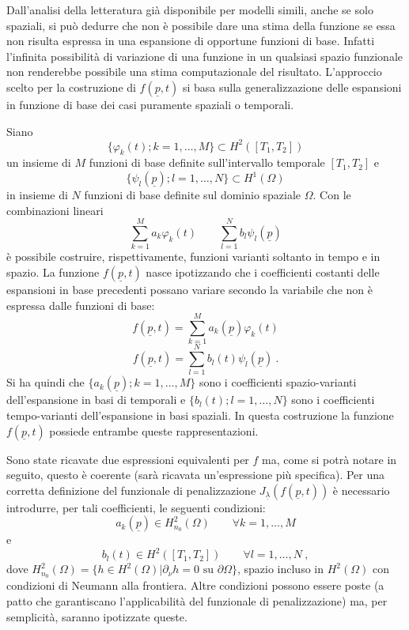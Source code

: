 \documentclass[a4paper,11pt,twoside,openright]{book}							%
\begin{document}
Dall'analisi della letteratura già disponibile per modelli simili, anche se solo spaziali, si può dedurre che non è possibile dare una stima della funzione se essa non risulta espressa in una espansione di opportune funzioni di base. Infatti l'infinita possibilità di variazione di una funzione in un qualsiasi spazio funzionale non renderebbe possibile una stima computazionale del risultato. L'approccio scelto per la costruzione di $f(\underline p,t)$ si basa sulla generalizzazione delle espansioni in funzione di base dei casi puramente spaziali o temporali.

Siano 
$$
\{ \varphi_k(t);k=1, \ldots , M \} \subset H^2([T_1,T_2])
$$
un insieme di $M$ funzioni di base definite sull'intervallo temporale $[T_1,T_2]$ e
$$
\{ \psi_l(\underline p);l=1, \ldots , N \} \subset H^1(\Omega)
$$
in insieme di $N$ funzioni di base definite sul dominio spaziale $\Omega$. Con le combinazioni lineari
$$
\sum_{k=1}^M a_k\varphi_k(t) \qquad \sum_{l=1}^N b_l\psi_l(\underline p)
$$
è possibile costruire, rispettivamente, funzioni varianti soltanto in tempo e in spazio. La funzione $f(\underline p,t)$ nasce ipotizzando che i coefficienti costanti delle espansioni in base precedenti possano variare secondo la variabile che non è espressa dalle funzioni di base:
\begin{equation} 
\label{eq:f_temp}
f(\underline p, t) = \sum_{k=1}^M a_k(\underline p)\varphi_k(t)
\end{equation}
\begin{equation}
\label{eq:f_space}
f(\underline p, t) = \sum_{l=1}^N b_l(t)\psi_l(\underline p) \ .
\end{equation}
Si ha quindi che $\{ a_k(\underline p);k=1, \ldots , M \}$ sono i coefficienti spazio-varianti dell'espansione in basi di temporali e $\{ b_l(t);l=1, \ldots , N \}$ sono i coefficienti tempo-varianti dell'espansione in basi spaziali. In questa costruzione la funzione $f(\underline p,t)$ possiede entrambe queste rappresentazioni.

Sono state ricavate due espressioni equivalenti per $f$ ma, come si potrà notare in seguito, questo è coerente (sarà ricavata un'espressione più specifica). Per una corretta definizione del funzionale di penalizzazione $J_{\underline \lambda }(f(\underline p,t))$ è necessario introdurre, per tali coefficienti, le seguenti condizioni:
$$
a_k(\underline p) \in H_{n_0}^2(\Omega) \qquad \forall k=1, \ldots , M
$$
e
$$
b_l(t) \in H^2([T_1,T_2]) \qquad \forall l=1, \ldots , N \ ,
$$
dove $H^2_{n_0}(\Omega) = \{h \in H^2(\Omega) | \partial _{\nu}h=0 \mbox{ su } \partial \Omega\}$, spazio incluso in $H^2(\Omega)$ con condizioni di Neumann alla frontiera. Altre condizioni possono essere poste (a patto che garantiscano l'applicabilità del funzionale di penalizzazione) ma, per semplicità, saranno ipotizzate queste.
\end{document}
